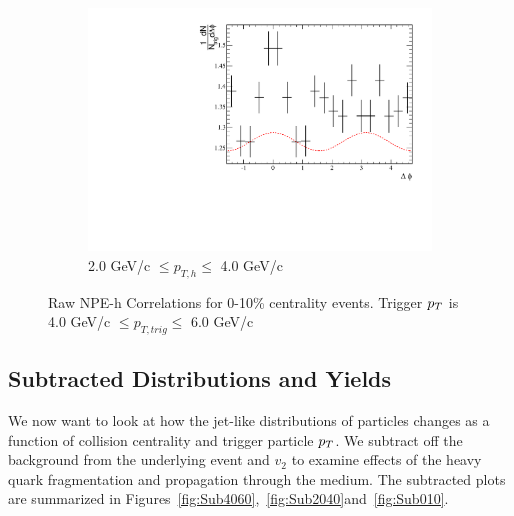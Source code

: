 \begin{figure}[htbp]
\begin{center}
\begin{subfigure}{0.5\textwidth}
		\includegraphics[width=\textwidth]{Plots/Correlations/raw/NPE_eh_corr_raw_primpt_4_5_cent_7_8_assopt_3_4.pdf}
		\caption{2.0 GeV/c $\leq p_{T,h} \leq$ 4.0 GeV/c}
		\label{fig:Raw010c}
	\end{subfigure}	
\end{center}
\caption[Raw Correlations 0-10\% Centrality]{Raw NPE-h Correlations for 0-10\% centrality events. Trigger $p_{T}$ is 4.0 GeV/c $\leq p_{T,trig} \leq$ 6.0 GeV/c}
\label{fig:Raw010}
\end{figure}

\subsection{Subtracted Distributions and Yields}

We now want to look at how the jet-like distributions of particles changes as a function of collision centrality and trigger particle $p_{T}$. We subtract off the background from the underlying event and $v_2$ to examine effects of the heavy quark fragmentation and propagation through the medium. The subtracted plots are summarized in Figures~\ref{fig:Sub4060},~\ref{fig:Sub2040}and~\ref{fig:Sub010}.

